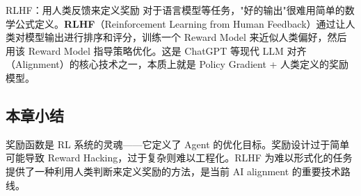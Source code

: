 \begin{knowledgebox}{RLHF：用人类反馈来定义奖励}
对于语言模型等任务，"好的输出"很难用简单的数学公式定义。\textbf{RLHF}（Reinforcement Learning from Human Feedback）通过让人类对模型输出进行排序和评分，训练一个 Reward Model 来近似人类偏好，然后用该 Reward Model 指导策略优化。这是 ChatGPT 等现代 LLM 对齐（Alignment）的核心技术之一，本质上就是 Policy Gradient + 人类定义的奖励模型。
\end{knowledgebox}

\subsection{本章小结}

奖励函数是 RL 系统的灵魂------它定义了 Agent 的优化目标。奖励设计过于简单可能导致 Reward Hacking，过于复杂则难以工程化。RLHF 为难以形式化的任务提供了一种利用人类判断来定义奖励的方法，是当前 AI alignment 的重要技术路线。



